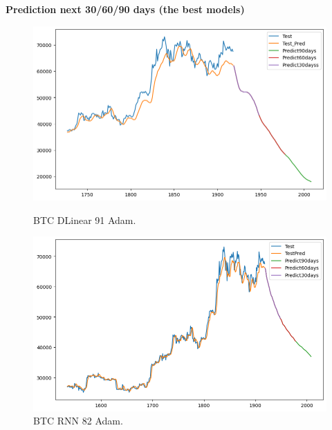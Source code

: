 \documentclass{ieeeojies}
\begin{document}
\textbf{Prediction next 30/60/90 days (the best models)}
\begin{figure}[H]
  \centering
  \begin{minipage}{0.48\linewidth}
    \centering
    \includegraphics[width=1\linewidth]{image/BTC_DLinear_91_Adam.png}
    \caption{BTC DLinear 91 Adam.}
  \end{minipage}
  \hfill
  \begin{minipage}{0.48\linewidth}
    \centering
    \includegraphics[width=1\linewidth]{image/BTC_RNN_82_Adam.png}
    \caption{BTC RNN 82 Adam.}
  \end{minipage}
\end{figure}
\end{document}
